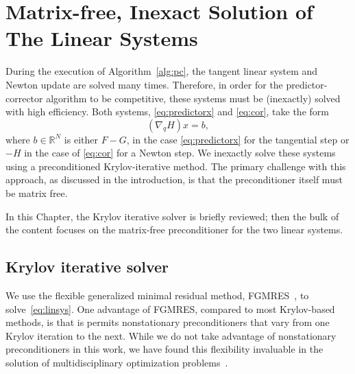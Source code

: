  
\chapter{Matrix-free, Inexact Solution of The Linear Systems}\label{chap:linsys}
During the execution of Algorithm~\ref{alg:pc}, the tangent linear system and
Newton update are solved many times.  Therefore, in order for the
predictor-corrector algorithm to be competitive, these systems must be
(inexactly) solved with high efficiency.  Both systems, \eqref{eq:predictorx}
and \eqref{eq:cor}, take the form
\begin{equation}\label{eq:linsys}
  (\nabla_q H) x = b,
\end{equation}
where $b \in
\mathbb{R}^{N}$ is either $F - G$, in the case \eqref{eq:predictorx} for the tangential step or $-H$ in the case of \eqref{eq:cor} for a Newton step.  We inexactly solve these systems using a preconditioned
Krylov-iterative method.  The primary challenge with this approach, as discussed
in the introduction, is that the preconditioner itself must be matrix free.

In this Chapter, the Krylov iterative solver is briefly reviewed; then the bulk of the content focuses on
the matrix-free preconditioner for the two linear systems. 

\section{Krylov iterative solver}
We use the flexible generalized minimal residual method,
FGMRES~\cite{Saad1993fgmres}, to solve~\eqref{eq:linsys}.  One advantage of
FGMRES, compared to most Krylov-based methods, is that is permits nonstationary
preconditioners that vary from one Krylov iteration to the next.  While we do
not take advantage of nonstationary preconditioners in this work, we have found
this flexibility invaluable in the solution of multidisciplinary optimization
problems~\cite{dener:idf2017, dener:2014}.

